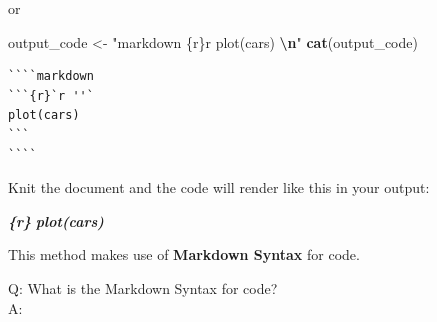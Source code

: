 \documentclass[
  a4paper,
  twoside,
  openright]{book}
\newenvironment{Shaded}{\begin{snugshade}}{\end{snugshade}}
\newcommand{\FunctionTok}[1]{\textcolor[rgb]{0.13,0.29,0.53}{\textbf{#1}}}
\newcommand{\InformationTok}[1]{\textcolor[rgb]{0.56,0.35,0.01}{\textbf{\textit{#1}}}}
\newcommand{\NormalTok}[1]{#1}
\newcommand{\OtherTok}[1]{\textcolor[rgb]{0.56,0.35,0.01}{#1}}
\newcommand{\SpecialCharTok}[1]{\textcolor[rgb]{0.81,0.36,0.00}{\textbf{#1}}}
\newcommand{\StringTok}[1]{\textcolor[rgb]{0.31,0.60,0.02}{#1}}
\theoremstyle{definition}
\theoremstyle{definition}
\theoremstyle{definition}
\theoremstyle{definition}
\theoremstyle{remark}
\begin{document}
or

\begin{Shaded}
\begin{Highlighting}[]
\NormalTok{output\_code }\OtherTok{\textless{}{-}}
\StringTok{"\textasciigrave{}\textasciigrave{}\textasciigrave{}\textasciigrave{}markdown}
\StringTok{\textasciigrave{}\textasciigrave{}\textasciigrave{}\{r\}\textasciigrave{}r \textquotesingle{}\textquotesingle{}\textasciigrave{}}
\StringTok{plot(cars)}
\StringTok{\textasciigrave{}\textasciigrave{}\textasciigrave{} }\SpecialCharTok{\textbackslash{}n}\StringTok{\textasciigrave{}\textasciigrave{}\textasciigrave{}\textasciigrave{}"}
\FunctionTok{cat}\NormalTok{(output\_code)}
\end{Highlighting}
\end{Shaded}

\begin{verbatim}
````markdown
```{r}`r ''`
plot(cars)
``` 
````
\end{verbatim}

Knit the document and the code will render like this in your output:

\begin{Shaded}
\begin{Highlighting}[]
\InformationTok{\textasciigrave{}\textasciigrave{}\textasciigrave{}\{r\}}
\InformationTok{plot(cars)}
\InformationTok{\textasciigrave{}\textasciigrave{}\textasciigrave{}}
\end{Highlighting}
\end{Shaded}

This method makes use of \textbf{Markdown Syntax} for code.

Q: What is the Markdown Syntax for code?\\
A:
\end{document}
